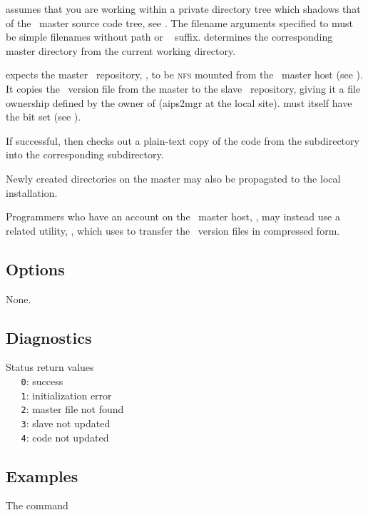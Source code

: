  assumes that you are working within a private directory tree which
shadows that of the \aipspp\ master source code tree, see .
The filename arguments specified to  must be simple filenames without
path or \rcs\  suffix.   determines the corresponding master
directory from the current working directory.

 expects the master \rcs\ repository, , to be
\textsc{nfs} mounted from the \aipspp\ master host (see
).  It copies the \rcs\ version file from the master to
the slave \rcs\ repository, giving it a file ownership defined by the owner of
 (aips2mgr at the local site).   must itself have the
 bit set (see ).

If successful,  then checks out a plain-text copy of the code from the
 subdirectory into the corresponding 
subdirectory.

Newly created directories on the master may also be propagated to the local
installation.

Programmers who have an account on the \aipspp\ master host,
, may instead use a related utility, , which
uses  to transfer the \rcs\ version files in compressed form.

\subsection*{Options}

None.

\subsection*{Diagnostics}

Status return values
\\ \verb+   0+: success
\\ \verb+   1+: initialization error
\\ \verb+   2+: master file not found
\\ \verb+   3+: slave not updated
\\ \verb+   4+: code not updated

\subsection*{Examples}

The command

